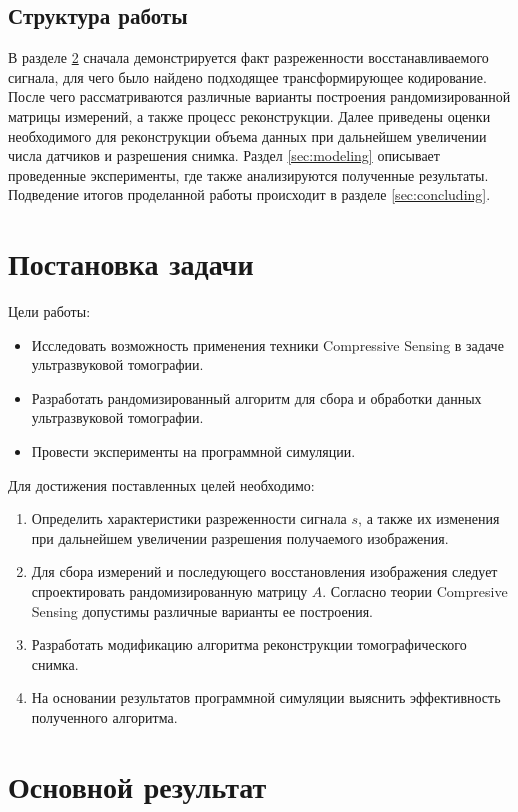 \documentclass[14pt]{matmex-diploma}
\begin{document}
\subsection{Структура работы}
В разделе \ref{sec:main_result} 
 сначала демонстрируется факт разреженности восстанавливаемого сигнала, для чего было найдено подходящее трансформирующее кодирование. После чего рассматриваются различные варианты построения рандомизированной матрицы измерений, а также процесс реконструкции. Далее приведены оценки необходимого для реконструкции объема данных при дальнейшем увеличении числа датчиков и разрешения снимка. Раздел \ref{sec:modeling} 
 описывает проведенные эксперименты, где также анализируются полученные результаты. Подведение итогов проделанной работы происходит в разделе \ref{sec:concluding}.

\section{Постановка задачи}
Цели работы:
\begin{itemize}
  \item Исследовать возможность применения техники Compressive Sensing в задаче ультразвуковой томографии.
  \item Разработать рандомизированный алгоритм для сбора и обработки данных ультразвуковой томографии.
  \item Провести эксперименты на программной симуляции.
\end{itemize}

Для достижения поставленных целей необходимо:
\begin{enumerate}
\item Определить характеристики разреженности сигнала $s$, а также их изменения при дальнейшем увеличении разрешения получаемого изображения.
\item Для сбора измерений и последующего восстановления изображения следует спроектировать рандомизированную матрицу $A$. Согласно теории Compresive Sensing допустимы различные варианты ее построения.
\item Разработать модификацию алгоритма реконструкции томографического снимка.
\item На основании результатов программной симуляции выяснить эффективность полученного алгоритма.
\end{enumerate}



\section{Основной результат} \label{sec:main_result}
\end{document}
